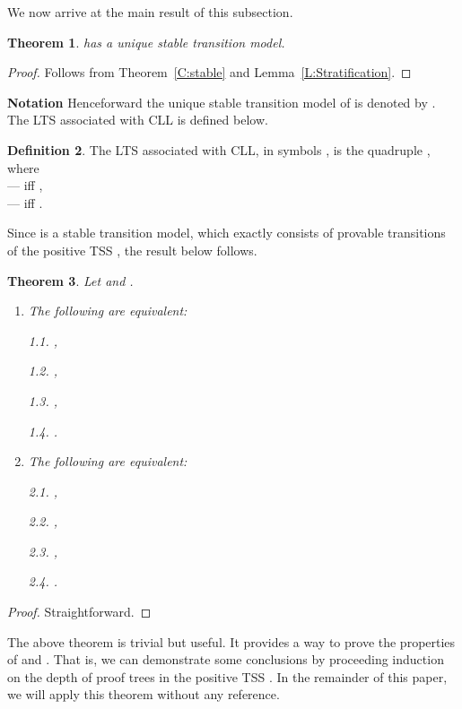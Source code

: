 \documentclass{elsarticle}
\theoremstyle{plain}
\newtheorem{theorem}{Theorem}[section]
\theoremstyle{definition}
\newtheorem{mydefn}[theorem]{Definition}
\begin{document}
We now arrive at the main result of this subsection.

\begin{theorem}
     has a unique stable transition model.
\end{theorem}
\begin{proof}
Follows from Theorem~\ref{C:stable} and Lemma~\ref{L:Stratification}.
\end{proof}

\noindent\textbf{Notation}
Henceforward the unique stable transition model of  is denoted by .  \\

The LTS associated with CLL is defined below.

\begin{mydefn}
    The LTS associated with CLL, in symbols , is the quadruple
    , where \\
    ---  iff ,\\
    ---  iff .
\end{mydefn}

Since  is a stable transition model, which exactly consists of provable transitions of the positive TSS , the result below follows.

\begin{theorem}
    Let  and .
  \begin{enumerate}
     \item The following are equivalent:

            1.1. ,

            1.2. ,

            1.3. ,

            1.4. .

     \item The following are equivalent:

            2.1. ,

            2.2. ,

            2.3. ,

            2.4. .

   \end{enumerate}
\end{theorem}
\begin{proof}
  Straightforward.
\end{proof}

The above theorem is trivial but useful. It provides a way to prove the properties of  and . That is, we can demonstrate some conclusions by proceeding induction on the depth of proof trees in the positive TSS .  In the remainder of this paper, we will apply this theorem without any reference.
\end{document}
